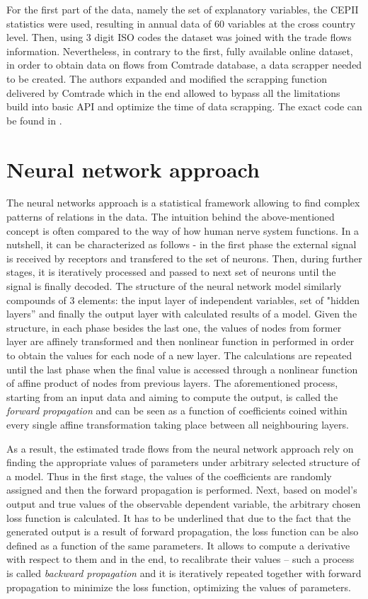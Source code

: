 \documentclass{Trade_template}
\numberwithin{equation}{section}
\begin{document}
For the first part of the data, namely the set of explanatory variables, the CEPII statistics were used, resulting in annual data of 60 variables at the cross country level. Then, using 3 digit ISO codes the dataset was joined with the trade flows information. Nevertheless, in contrary to the first, fully available online dataset, in order to obtain data on flows from Comtrade database, a data scrapper needed to be created. The authors expanded and modified the scrapping function delivered by Comtrade which in the end allowed to bypass all the limitations build into basic API and optimize the time of data scrapping. The exact code can be found in . 

\chapter{Neural network approach}

The neural networks approach is a statistical framework allowing to find complex patterns of relations in the data. The intuition behind the above-mentioned concept is often compared to the way of how human nerve system functions. In a nutshell, it can be characterized as follows - in the first phase the external signal is received by receptors and transfered to the set of neurons. Then, during further stages, it is iteratively processed and passed to next set of neurons until the signal is finally decoded. The structure of the neural network model similarly compounds of 3 elements: the input layer of independent variables, set of "hidden layers” and finally the output layer with calculated results of a model. Given the structure, in each phase besides the last one, the values of nodes from former layer are affinely transformed and then nonlinear function in performed in order to obtain the values for each node of a new layer. The calculations are repeated until the last phase when the final value is accessed through a nonlinear function of affine product of nodes from previous layers. The aforementioned process, starting from an input data and aiming to compute the output, is called the \textit{forward propagation} and can be seen as a function of coefficients coined within every single affine transformation taking place between all neighbouring layers.

As a result, the estimated trade flows from the neural network approach rely on finding the appropriate values of parameters under arbitrary selected structure of a model. Thus in the first stage, the values of the coefficients are randomly assigned and then the forward propagation is performed. Next, based on model’s output and true values of the observable dependent variable, the arbitrary chosen loss function is calculated. It has to be underlined that due to the fact that the generated output is a result of forward propagation, the loss function can be also defined as a function of the same parameters. It allows to compute a derivative with respect to them and in the end, to recalibrate their values – such a process is called  \textit{backward propagation} and it is iteratively repeated together with forward propagation to minimize the loss function, optimizing the values of parameters. 
\end{document}
